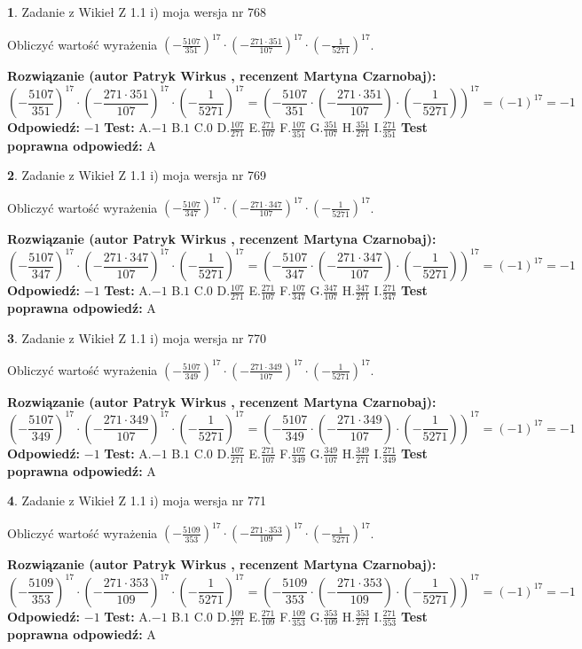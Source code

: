 \documentclass[12pt, a4paper]{article}
\theoremstyle{definition} %
\newtheorem{zad}{}
\newcommand{\zadStart}[1]{\begin{zad}#1\newline}
\newcommand{\zadStop}{\end{zad}}
\newcommand{\rozwStart}[2]{\noindent \textbf{Rozwiązanie (autor #1 , recenzent #2): }\newline}
\newcommand{\rozwStop}{\newline}
\newcommand{\odpStart}{\noindent \textbf{Odpowiedź:}\newline}
\newcommand{\odpStop}{\newline}
\newcommand{\testStart}{\noindent \textbf{Test:}\newline}
\newcommand{\testStop}{\newline}
\newcommand{\kluczStart}{\noindent \textbf{Test poprawna odpowiedź:}\newline}
\newcommand{\kluczStop}{\newline}
\begin{document}
\zadStart{Zadanie z Wikieł Z 1.1 i) moja wersja nr 768}

Obliczyć wartość wyrażenia $(-\frac{5107}{351})^{17} \cdot (-\frac{271 \cdot 351}{107})^{17} \cdot (-\frac{1}{5271})^{17}$.
\zadStop
\rozwStart{Patryk Wirkus}{Martyna Czarnobaj}
$$(-\frac{5107}{351})^{17} \cdot (-\frac{271 \cdot 351}{107})^{17} \cdot (-\frac{1}{5271})^{17} = (-\frac{5107}{351} \cdot (-\frac{271 \cdot 351}{107}) \cdot (-\frac{1}{5271}))^{17} = (-1)^{17} = -1$$
\rozwStop
\odpStart
$-1$
\odpStop
\testStart
A.$-1$ B.$1$ C.$0$ D.$\frac{107}{271}$ E.$\frac{271}{107}$
F.$\frac{107}{351}$ G.$\frac{351}{107}$
H.$\frac{351}{271}$
I.$\frac{271}{351}$
\testStop
\kluczStart
A
\kluczStop



\zadStart{Zadanie z Wikieł Z 1.1 i) moja wersja nr 769}

Obliczyć wartość wyrażenia $(-\frac{5107}{347})^{17} \cdot (-\frac{271 \cdot 347}{107})^{17} \cdot (-\frac{1}{5271})^{17}$.
\zadStop
\rozwStart{Patryk Wirkus}{Martyna Czarnobaj}
$$(-\frac{5107}{347})^{17} \cdot (-\frac{271 \cdot 347}{107})^{17} \cdot (-\frac{1}{5271})^{17} = (-\frac{5107}{347} \cdot (-\frac{271 \cdot 347}{107}) \cdot (-\frac{1}{5271}))^{17} = (-1)^{17} = -1$$
\rozwStop
\odpStart
$-1$
\odpStop
\testStart
A.$-1$ B.$1$ C.$0$ D.$\frac{107}{271}$ E.$\frac{271}{107}$
F.$\frac{107}{347}$ G.$\frac{347}{107}$
H.$\frac{347}{271}$
I.$\frac{271}{347}$
\testStop
\kluczStart
A
\kluczStop



\zadStart{Zadanie z Wikieł Z 1.1 i) moja wersja nr 770}

Obliczyć wartość wyrażenia $(-\frac{5107}{349})^{17} \cdot (-\frac{271 \cdot 349}{107})^{17} \cdot (-\frac{1}{5271})^{17}$.
\zadStop
\rozwStart{Patryk Wirkus}{Martyna Czarnobaj}
$$(-\frac{5107}{349})^{17} \cdot (-\frac{271 \cdot 349}{107})^{17} \cdot (-\frac{1}{5271})^{17} = (-\frac{5107}{349} \cdot (-\frac{271 \cdot 349}{107}) \cdot (-\frac{1}{5271}))^{17} = (-1)^{17} = -1$$
\rozwStop
\odpStart
$-1$
\odpStop
\testStart
A.$-1$ B.$1$ C.$0$ D.$\frac{107}{271}$ E.$\frac{271}{107}$
F.$\frac{107}{349}$ G.$\frac{349}{107}$
H.$\frac{349}{271}$
I.$\frac{271}{349}$
\testStop
\kluczStart
A
\kluczStop



\zadStart{Zadanie z Wikieł Z 1.1 i) moja wersja nr 771}

Obliczyć wartość wyrażenia $(-\frac{5109}{353})^{17} \cdot (-\frac{271 \cdot 353}{109})^{17} \cdot (-\frac{1}{5271})^{17}$.
\zadStop
\rozwStart{Patryk Wirkus}{Martyna Czarnobaj}
$$(-\frac{5109}{353})^{17} \cdot (-\frac{271 \cdot 353}{109})^{17} \cdot (-\frac{1}{5271})^{17} = (-\frac{5109}{353} \cdot (-\frac{271 \cdot 353}{109}) \cdot (-\frac{1}{5271}))^{17} = (-1)^{17} = -1$$
\rozwStop
\odpStart
$-1$
\odpStop
\testStart
A.$-1$ B.$1$ C.$0$ D.$\frac{109}{271}$ E.$\frac{271}{109}$
F.$\frac{109}{353}$ G.$\frac{353}{109}$
H.$\frac{353}{271}$
I.$\frac{271}{353}$
\testStop
\kluczStart
A
\kluczStop
\end{document}
